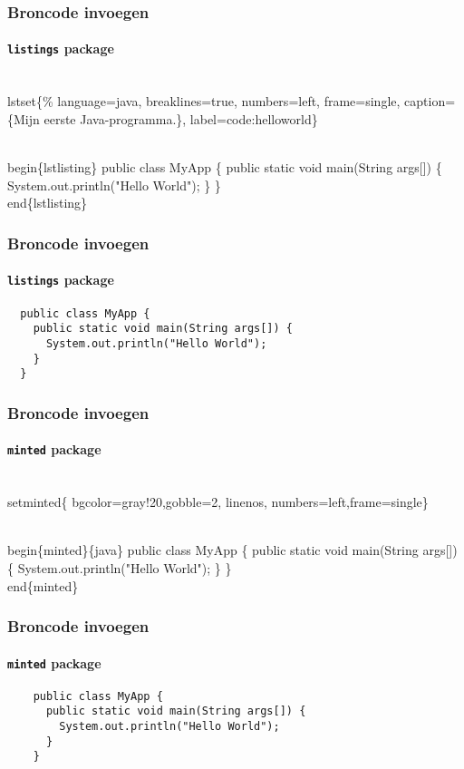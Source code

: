 \documentclass[aspectratio=169]{beamer}
\begin{document}
\begin{frame}[fragile]
 \frametitle{Broncode invoegen}
 \framesubtitle{\texttt{listings} package}

\begin{semiverbatim}
\\lstset\{\%
language=java,  breaklines=true,  numbers=left,
frame=single, caption=\{Mijn eerste Java-programma.\},
label=code:helloworld\}

\alert{\\begin\{lstlisting\}}
public class MyApp \{
 public static void main(String args[]) \{
   System.out.println("Hello World");
 \}
\}
\alert{\\end\{lstlisting\}}
\end{semiverbatim}

\end{frame}

\begin{frame}[fragile]
  \frametitle{Broncode invoegen}
  \framesubtitle{\texttt{listings} package}


  \begin{lstlisting}
  public class MyApp {
    public static void main(String args[]) {
      System.out.println("Hello World");
    }
  }
  \end{lstlisting}

\end{frame}

\begin{frame}[fragile]
  \frametitle{Broncode invoegen}
  \framesubtitle{\texttt{minted} package}

  \begin{semiverbatim}
  \\setminted\{%
    bgcolor=gray!20,gobble=2, linenos,
    numbers=left,frame=single\}

  \\begin\{minted\}\{java\}
    public class MyApp \{
      public static void main(String args[]) \{
        System.out.println("Hello World");
      \}
    \}
  \\end\{minted\}
  \end{semiverbatim}
\end{frame}

\begin{frame}[fragile]
  \frametitle{Broncode invoegen}
  \framesubtitle{\texttt{minted} package}
  \begin{verbatim}
    public class MyApp {
      public static void main(String args[]) {
        System.out.println("Hello World");
      }
    }
  \end{verbatim}
\end{frame}
\end{document}
